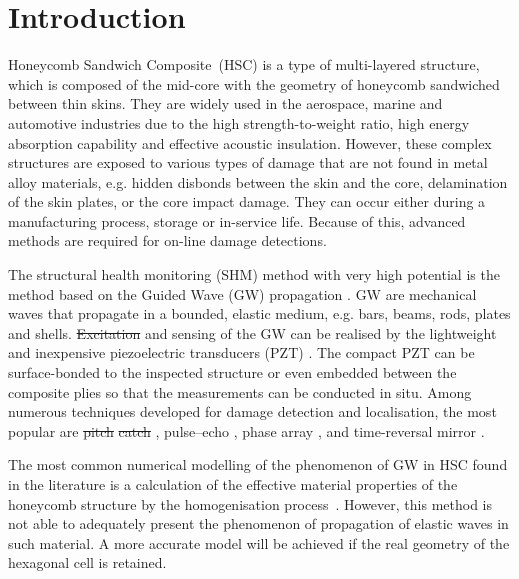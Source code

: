\documentclass[materials,article,submit,moreauthors,pdftex]{Definitions/mdpi}
\providecommand{\DIFadd}[1]{{\protect\color{blue}{#1}}} %
\providecommand{\DIFdel}[1]{{\protect\color{red}\sout{#1}}}                      %
\providecommand{\DIFaddbegin}{} %
\providecommand{\DIFaddend}{} %
\providecommand{\DIFdelbegin}{} %
\providecommand{\DIFdelend}{} %
\begin{document}
\section{Introduction}
\label{sec:intro}
Honeycomb Sandwich Composite~(HSC) is a type of multi-layered structure, which is composed of the mid-core with the geometry of honeycomb sandwiched between thin skins.
They are widely used in the aerospace, marine and automotive industries due to the high strength-to-weight ratio, high energy absorption capability and effective acoustic insulation.
However, these complex structures are exposed to various types of damage that are not found in metal alloy materials, e.g. hidden disbonds between the skin and the core, delamination of the skin plates, or the core impact damage.
They can occur either during a manufacturing process, storage or in-service life.
Because of this, advanced methods are required for on-line damage detections.

The structural health monitoring (SHM) method with very high potential is the method based on the Guided Wave (GW) propagation \cite{mustapha2011assessment, sikdar2016guided, sikdar2016ultrasonic,radzienski2016assessment, yu2019core}.
GW are mechanical waves that propagate in a bounded, elastic medium, e.g. bars, beams, rods, plates and shells.
\DIFdelbegin \DIFdel{Excitation }\DIFdelend \DIFaddbegin \DIFadd{The wavelength of GW is longer than the thickness of bounding elastic medium.
An excitation }\DIFaddend and sensing of the GW can be realised by the lightweight and inexpensive piezoelectric transducers (PZT) \cite{giurgiutiumicromechatronics}.
The compact PZT can be surface-bonded to the inspected structure or even embedded between the composite plies so that the measurements can be conducted in situ.
Among numerous techniques developed for damage detection and localisation, the most popular are \DIFdelbegin \DIFdel{pitch}%
\DIFdel{catch }\DIFdelend \DIFaddbegin \DIFadd{pitch--catch }\DIFaddend \cite{ihn2008pitch, sikdar2017structural}, pulse--echo \cite{guo1993interaction, kudela2008damage}, phase array \cite{lu2006crack, ostachowicz2008elastic}, and time-reversal mirror \cite{fink1992time, eremin2016analytically}.

The most common numerical modelling of the phenomenon of GW in HSC found in the literature is a calculation of the effective material properties of the honeycomb structure by the homogenisation process~\cite{shi1995derivation, qi2008ultrasonic, mustapha2014leaky, baid2015dispersion, sikdar2016guided}.
However, this method is not able to adequately present the phenomenon of propagation of elastic waves in \DIFaddbegin \DIFadd{a }\DIFaddend such material.
A more accurate model will be achieved if the real geometry of the hexagonal cell is retained.
\end{document}
